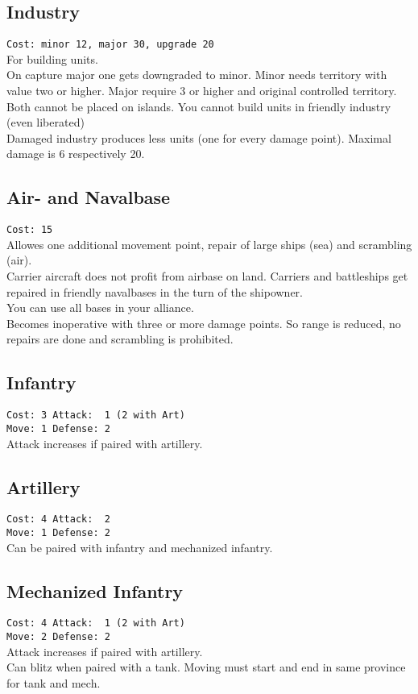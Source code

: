 \documentclass[10pt,twoside]{article}
\begin{document}
\begin{multicols*}{3}
\subsection*{Industry}
\texttt{Cost: minor 12, major 30, upgrade 20}\\
For building units.\\
On capture major one gets downgraded to minor.
Minor needs territory with value two or higher. Major require 3 or higher and original controlled territory. Both cannot be placed on islands. You cannot build units in friendly industry (even liberated)\\
Damaged industry produces less units (one for every damage point). Maximal damage is 6 respectively 20.

\subsection*{Air- and Navalbase}
\texttt{Cost: 15}\\
Allowes one additional movement point, repair of large ships (sea) and scrambling (air).\\
Carrier aircraft does not profit from airbase on land. Carriers and battleships get repaired in friendly navalbases in the turn of the shipowner.
\\You can use all bases in your alliance.\\
Becomes inoperative with three or more damage points. So range is reduced, no repairs are done and scrambling is prohibited.

\subsection*{Infantry}
\texttt{Cost: 3 \quad\quad\quad Attack: ~1 (2 with Art) \\ Move: 1 \quad\quad\quad Defense: 2 \\ }
Attack increases if paired with artillery.

\subsection*{Artillery}
\texttt{Cost: 4 \quad\quad\quad Attack: ~2 \\ Move: 1 \quad\quad\quad Defense: 2 \\ }
Can be paired with infantry and mechanized infantry.

\subsection*{Mechanized Infantry}
\texttt{Cost: 4 \quad\quad\quad Attack: ~1 (2 with Art) \\ Move: 2 \quad\quad\quad Defense: 2 \\ }
Attack increases if paired with artillery.\\
Can blitz when paired with a tank. Moving must start and end in same province for tank and mech.


\end{multicols*}
\end{document}

